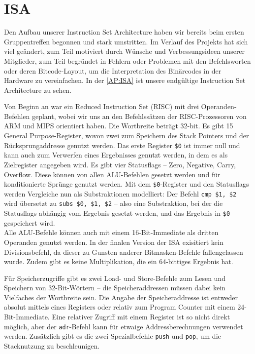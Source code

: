 \section{ISA}
Den Aufbau unserer Instruction Set Architecture haben wir bereits beim ersten Gruppentreffen begonnen und stark umstritten.
Im Verlauf des Projekts hat sich viel geändert, zum Teil motiviert durch Wünsche und Verbessungsideen unserer Mitglieder,
zum Teil begründet in Fehlern oder Problemen mit den Befehlsworten oder deren Bitcode-Layout, um die Interpretation des Binärcodes in der Hardware zu vereinfachen.
In der \autoref{AP:ISA} ist unsere endgültige Instruction Set Architecture zu sehen.

Von Beginn an war ein Reduced Instruction Set (RISC) mit drei Operanden-Befehlen geplant,
wobei wir uns an den Befehlssätzen der RISC-Prozessoren von ARM und MIPS orientiert haben.
Die Wortbreite beträgt 32-bit. Es gibt 15 General Purpose-Register, wovon zwei zum Speichern des Stack Pointers und der Rücksprungaddresse genutzt werden.
Das erste Register \texttt{\$0} ist immer null und kann auch zum Verwerfen eines Ergebnisses genutzt werden, in dem es als Zielregister angegeben wird.
Es gibt vier Statusflags -- Zero, Negative, Carry, Overflow.
Diese können von allen ALU-Befehlen gesetzt werden und für konditionierte Sprünge genutzt werden.
Mit dem \texttt{\$0}-Register und den Statusflags werden Vergleiche nun als Substraktionen modelliert:
Der Befehl \texttt{cmp \$1, \$2} wird übersetzt zu \texttt{subs \$0, \$1, \$2} --
also eine Substraktion, bei der die Statusflags abhängig vom Ergebnis gesetzt werden, und das Ergebnis in \texttt{\$0} gespeichert wird. \\
Alle ALU-Befehle können auch mit einem 16-Bit-Immediate als dritten Operanden genutzt werden.
In der finalen Version der ISA exisitiert kein Divisionsbefehl, da dieser zu Gunsten anderer Bitmasken-Befehle fallengelassen wurde.
Zudem gibt es keine Multiplikation, die ein 64-bittiges Ergebnis hat.

Für Speicherzugriffe gibt es zwei Load- und Store-Befehle zum Lesen und Speichern von 32-Bit-Wörtern --
die Speicheraddressen müssen dabei kein Vielfaches der Wortbreite sein.
Die Angabe der Speicheraddresse ist entweder absolut mittels eines Registers oder relativ zum Program Counter mit einem 24-Bit-Immediate.
Eine relativer Zugriff mit einem Register ist so nicht direkt möglich, aber der \texttt{adr}-Befehl kann für etwaige Addressberechnungen verwendet werden.
Zusätzlich gibt es die zwei Spezialbefehle \texttt{push} und \texttt{pop}, um die Stacknutzung zu beschleunigen.

